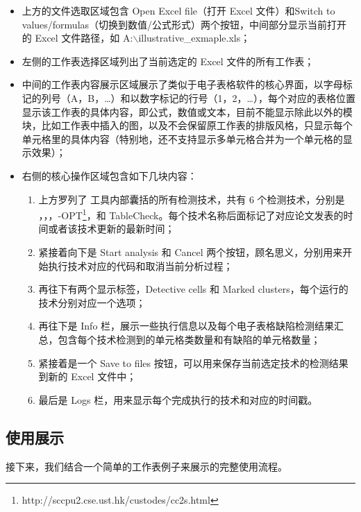 \begin{itemize}
    \item 上方的文件选取区域包含 Open Excel file（打开 Excel 文件）和Switch to values/formulas（切换到数值/公式形式）两个按钮，中间部分显示当前打开的 Excel 文件路径，如 A:$\backslash$illustrative\_exmaple.xls；
    \item 左侧的工作表选择区域列出了当前选定的 Excel 文件的所有工作表；
    \item 中间的工作表内容展示区域展示了类似于电子表格软件的核心界面，以字母标记的列号（A，B，\dots）和以数字标记的行号（1，2，\dots），每个对应的表格位置显示该工作表的具体内容，即公式，数值或文本，目前不能显示除此以外的模块，比如工作表中插入的图，以及不会保留原工作表的排版风格，只显示每个单元格里的具体内容（特别地，还不支持显示多单元格合并为一个单元格的显示效果）；
    \item 右侧的核心操作区域包含如下几块内容：
        \begin{enumerate}
            \item 上方罗列了 \sg 工具内部囊括的所有检测技术，共有 6 个检测技术，分别是 \am\cite{dou2014spreadsheet}，\ca\cite{dou2017cacheck}，\cu\cite{cheung2016custodes}，\cu-OPT\footnote{http://sccpu2.cse.ust.hk/custodes/cc2s.html}，\wa 和 TableCheck\cite{dou2016detecting}。每个技术名称后面标记了对应论文发表的时间或者该技术更新的最新时间；
            \item 紧接着向下是 Start analysis 和 Cancel 两个按钮，顾名思义，分别用来开始执行技术对应的代码和取消当前分析过程；
            \item 再往下有两个显示标签，Detective cells 和 Marked clusters，每个运行的技术分别对应一个选项；
            \item 再往下是 Info 栏，展示一些执行信息以及每个电子表格缺陷检测结果汇总，包含每个技术检测到的单元格类数量和有缺陷的单元格数量；
            \item 紧接着是一个 Save to files 按钮，可以用来保存当前选定技术的检测结果到新的 Excel 文件中；
            \item 最后是 Logs 栏，用来显示每个完成执行的技术和对应的时间戳。
        \end{enumerate}
\end{itemize}

\subsection{使用展示}

接下来，我们结合一个简单的工作表例子来展示\sg 的完整使用流程。


